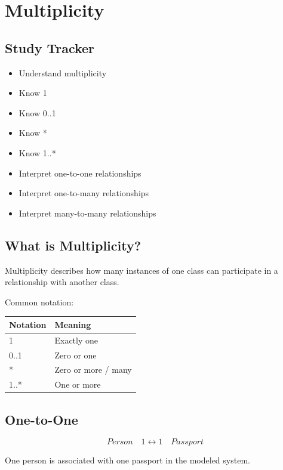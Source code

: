 \documentclass[11pt,a4paper]{article}
\newcommand{\checkitem}{$\square$}
\begin{document}
\section{Multiplicity}

\subsection{Study Tracker}

\begin{itemize}[label=\checkitem]
    \item Understand multiplicity
    \item Know 1
    \item Know 0..1
    \item Know *
    \item Know 1..*
    \item Interpret one-to-one relationships
    \item Interpret one-to-many relationships
    \item Interpret many-to-many relationships
\end{itemize}

\subsection{What is Multiplicity?}

Multiplicity describes how many instances of one class can participate in a
relationship with another class.

Common notation:

\begin{tabularx}{\textwidth}{|p{}|X|}
\hline
\textbf{Notation} & \textbf{Meaning}\\
\hline
1 & Exactly one\\
\hline
0..1 & Zero or one\\
\hline
* & Zero or more / many\\
\hline
1..* & One or more\\
\hline
\end{tabularx}

\subsection{One-to-One}

\[
Person \quad 1 \longleftrightarrow 1 \quad Passport
\]

One person is associated with one passport in the modeled system.
\end{document}
